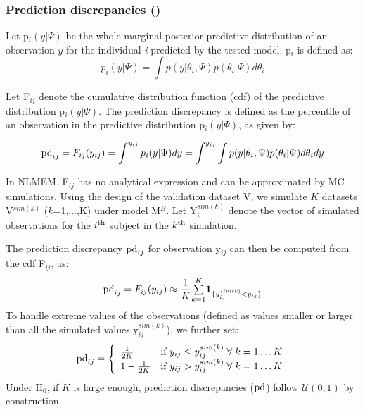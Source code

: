 \subsubsection{Prediction discrepancies (\pd)}

\hskip 18pt Let p$_{i}(y|\Psi)$ be the whole marginal posterior predictive distribution of an observation $y$ for 
the individual \emph{i} predicted by the tested model. p$_i$ is defined as: $$p_{i}(y|\Psi)=\int 
p(y|\theta_{i},\Psi) p(\theta_{i}|\Psi)d\theta_{i}$$

Let F$_{ij}$ denote the cumulative distribution function (cdf) of the predictive distribution p$_{i}(y|\Psi)$. The 
prediction discrepancy is defined as the percentile of an observation in the predictive distribution 
p$_{i}(y|\Psi)$, as given by: 

$${\rm pd}_{ij}=F_{ij}(y_{ij})=\int^{y_{ij}} p_{i}(y|\Psi)dy=\int^{y_{ij}}\int 
p(y|\theta_{i},\Psi)p(\theta_{i}|\Psi)d\theta_{i}dy$$

In NLMEM, F$_{ij}$ has no analytical expression and can be approximated by MC simulations. Using the design of the 
validation dataset V, we simulate $K$ datasets V$^{sim(k)}$ ($k$=1,...,K) under model M$^B$. Let Y$_i^{sim(k)}$ 
denote the vector of simulated observations for the $i^{\rm th}$ subject in the $k^{\rm th}$ simulation. 

The prediction discrepancy ${\rm pd}_{ij}$ for observation y$_{ij}$ can then be computed from the cdf F$_{ij}$, as: 
\begin{equation} 
\pd_{ij} = F_{ij}(y_{ij}) \approx \frac{1}{K}{\textstyle \overset{K}{\underset{k=1}{\sum}}\boldsymbol{1}_{ \{y_{ij}^{sim(k)}<y_{ij} \}}} \label{eq:pdedef} 
\end{equation} To 
handle extreme values of the observations (defined as values smaller or larger than all the simulated values 
y$_{ij}^{sim(k)}$), we further set: 
\begin{equation*} 
{\rm pd}_{ij} = \left\{ 
\begin{array}{l r} \frac{1}{2K} & \text{if } y_{ij} \leq y_{ij}^{sim(k)} \; \forall \; k=1\ldots K \\ 
1-\frac{1}{2K} & \text{if } y_{ij} > y_{ij}^{sim(k)} \; \forall \; k=1\ldots K \\ 
\end{array} \right. 
\end{equation*} 
Under H$_0$, if $K$ is large enough, prediction 
discrepancies (${\rm pd}$) follow $\mathcal{U}(0, 1)$ by construction.

